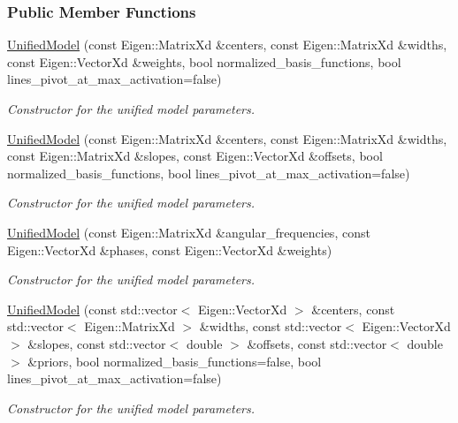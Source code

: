 \subsubsection*{Public Member Functions}
\begin{DoxyCompactItemize}
\item 
\hyperlink{classDmpBbo_1_1UnifiedModel_a597f14110f208256ba9124d9c839d520}{Unified\+Model} (const Eigen\+::\+Matrix\+Xd \&centers, const Eigen\+::\+Matrix\+Xd \&widths, const Eigen\+::\+Vector\+Xd \&weights, bool normalized\+\_\+basis\+\_\+functions, bool lines\+\_\+pivot\+\_\+at\+\_\+max\+\_\+activation=false)
\begin{DoxyCompactList}\small\item\em Constructor for the unified model parameters. \end{DoxyCompactList}\item 
\hyperlink{classDmpBbo_1_1UnifiedModel_ab217b9dbb87440828bd80f294621f6ea}{Unified\+Model} (const Eigen\+::\+Matrix\+Xd \&centers, const Eigen\+::\+Matrix\+Xd \&widths, const Eigen\+::\+Matrix\+Xd \&slopes, const Eigen\+::\+Vector\+Xd \&offsets, bool normalized\+\_\+basis\+\_\+functions, bool lines\+\_\+pivot\+\_\+at\+\_\+max\+\_\+activation=false)
\begin{DoxyCompactList}\small\item\em Constructor for the unified model parameters. \end{DoxyCompactList}\item 
\hyperlink{classDmpBbo_1_1UnifiedModel_a805750e8fa38cebe8dd37ce1d161ef04}{Unified\+Model} (const Eigen\+::\+Matrix\+Xd \&angular\+\_\+frequencies, const Eigen\+::\+Vector\+Xd \&phases, const Eigen\+::\+Vector\+Xd \&weights)
\begin{DoxyCompactList}\small\item\em Constructor for the unified model parameters. \end{DoxyCompactList}\item 
\hyperlink{classDmpBbo_1_1UnifiedModel_afa95162d1e912a9d254a0e253fd5f87a}{Unified\+Model} (const std\+::vector$<$ Eigen\+::\+Vector\+Xd $>$ \&centers, const std\+::vector$<$ Eigen\+::\+Matrix\+Xd $>$ \&widths, const std\+::vector$<$ Eigen\+::\+Vector\+Xd $>$ \&slopes, const std\+::vector$<$ double $>$ \&offsets, const std\+::vector$<$ double $>$ \&priors, bool normalized\+\_\+basis\+\_\+functions=false, bool lines\+\_\+pivot\+\_\+at\+\_\+max\+\_\+activation=false)
\begin{DoxyCompactList}\small\item\em Constructor for the unified model parameters. \end{DoxyCompactList}\item 

\end{DoxyCompactItemize}
